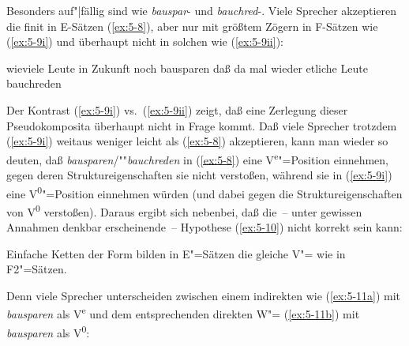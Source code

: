 \documentclass[output=paper]{LSP/langsci}
\begin{document}
Besonders auf"|fällig sind  wie \textit{bauspar}{}- und \textit{bauchred}{}-. Viele Sprecher akzeptieren die finit in E-Sätzen (\ref{ex:5-8}), aber nur mit größtem Zögern in F-Sätzen wie (\ref{ex:5-9i}) und überhaupt nicht in solchen wie (\ref{ex:5-9ii}):

\begin{exe}
\ex%
\label{ex:5-8}
\begin{xlist}
\ex%
\label{ex:5-8a}
wieviele Leute in Zukunft noch bausparen
\ex%
\label{ex:5-8b}
daß da mal wieder etliche Leute bauchreden
\end{xlist}


\ex%
\label{ex:5-9}
\begin{xlisti}
\ex%
\label{ex:5-9i}
\begin{xlista}
\end{xlista}
\ex%
\label{ex:5-9ii}
\begin{xlista}
\end{xlista}
\end{xlisti}
\end{exe}
Der Kontrast (\ref{ex:5-9i}) vs.\ (\ref{ex:5-9ii}) zeigt, daß eine Zerlegung dieser
Pseudokomposita überhaupt nicht in Frage kommt. Daß viele Sprecher
trotzdem (\ref{ex:5-9i}) weitaus weniger leicht als (\ref{ex:5-8}) akzeptieren, kann man
wieder so deuten, daß \textit{bausparen}/""\textit{bauchreden} in (\ref{ex:5-8})
eine V\textsuperscript{e}{}"=Position einnehmen, gegen deren
Struktureigenschaften sie nicht verstoßen, während sie in (\ref{ex:5-9i}) eine
V\textsuperscript{0}{}"=Position einnehmen würden (und dabei gegen die
Struktureigenschaften von V\textsuperscript{0} verstoßen). Daraus
ergibt sich nebenbei, daß die~-- unter gewissen Annahmen denkbar
erscheinende~-- Hypothese (\ref{ex:5-10}) nicht korrekt sein kann:

\begin{exe}
\ex%
\label{ex:5-10}
Einfache Ketten der Form  bilden in E"=Sätzen die gleiche V"= wie in F2"=Sätzen.
\end{exe}
Denn viele Sprecher unterscheiden zwischen einem indirekten  wie (\ref{ex:5-11a}) mit \textit{bausparen} als V\textsuperscript{e} und dem entsprechenden direkten W"= (\ref{ex:5-11b}) mit \textit{bausparen} als V\textsuperscript{0}:
\end{document}
